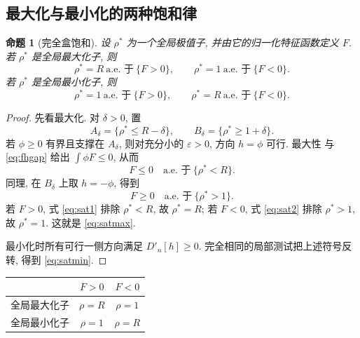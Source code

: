 \documentclass[UTF8]{ctexart}
\newtheorem{proposition}[theorem]{命题}
\begin{document}
\subsection{最大化与最小化的两种饱和律}

\begin{proposition}[完全盒饱和]\label{prop:saturation}
设 $\rho^*$ 为一个全局极值子, 并由它的归一化特征函数定义 $F$. 若 $\rho^*$ 是全局最大化子, 则
\begin{equation}
	\rho^*=R\ \text{a.e. 于}\ \{F>0\},\qquad
	\rho^*=1\ \text{a.e. 于}\ \{F<0\} .
	\label{eq:satmax}
\end{equation}
若 $\rho^*$ 是全局最小化子, 则
\begin{equation}
	\rho^*=1\ \text{a.e. 于}\ \{F>0\},\qquad
	\rho^*=R\ \text{a.e. 于}\ \{F<0\} .
	\label{eq:satmin}
\end{equation}
\end{proposition}

\begin{proof}
先看最大化. 对 $\delta>0$, 置
\begin{equation*}
	A_\delta=\{\rho^*\le R-\delta\},\qquad B_\delta=\{\rho^*\ge1+\delta\}.
\end{equation*}
若 $\phi\ge0$ 有界且支撑在 $A_\delta$, 则对充分小的 $\varepsilon>0$, 方向 $h=\phi$ 可行. 最大性
与 \eqref{eq:fhgap} 给出 $\int\phi F\le0$, 从而
\begin{equation}
	F\le0\quad\text{a.e. 于}\ \{\rho^*<R\}.
	\label{eq:sat1}
\end{equation}
同理, 在 $B_\delta$ 上取 $h=-\phi$, 得到
\begin{equation}
	F\ge0\quad\text{a.e. 于}\ \{\rho^*>1\}.
	\label{eq:sat2}
\end{equation}
若 $F>0$, 式 \eqref{eq:sat1} 排除 $\rho^*<R$, 故 $\rho^*=R$; 若 $F<0$, 式 \eqref{eq:sat2} 排除
$\rho^*>1$, 故 $\rho^*=1$. 这就是 \eqref{eq:satmax}.

最小化时所有可行一侧方向满足 $D'_n[h]\ge0$. 完全相同的局部测试把上述符号反转, 得到
\eqref{eq:satmin}.
\end{proof}

\begin{center}
\begin{tabular}{lcc}
\toprule
 & $F>0$ & $F<0$\\
\midrule
全局最大化子 & $\rho=R$ & $\rho=1$\\
全局最小化子 & $\rho=1$ & $\rho=R$\\
\bottomrule
\end{tabular}
\end{center}
\end{document}
